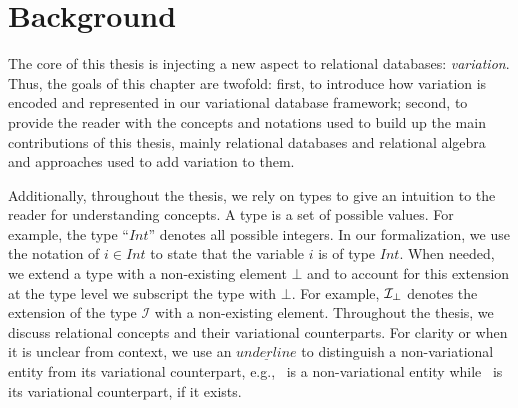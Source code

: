 \chapter{Background}
\label{ch:bg}

The core of this thesis is injecting a new aspect to relational databases: \emph{variation}.
Thus, the goals of this chapter are twofold: 
%
first, to introduce how variation is encoded and represented in our variational database framework;
%
second, to provide the reader with the concepts and notations
used to build up the main contributions of this thesis, mainly relational databases and
relational algebra
%
and approaches used to add variation to them.

%
Additionally, throughout the thesis, we rely on types to give an intuition to the reader for
understanding concepts. A type is a set of possible values. For example, the type ``$\mathit{Int}$''
denotes all possible integers. In our formalization, we use the notation of $i \in \mathit{Int}$ to
state that the variable $i$ is of type $\mathit{Int}$. 
%
%
When needed, we extend a type with a non-existing element $\bot$ and to account for this
extension at the type level we subscript the type with $\bot$. For example, $\maybe {\mathcal{I}}$
denotes the extension of the type $\mathcal{I}$ with a non-existing element.
%
%
Throughout the thesis, we discuss relational concepts and their
variational counterparts. 
For clarity or when it is unclear from context, we use
an $\underline{underline}$ to distinguish a non-variational entity
from its variational counterpart, 
e.g., \pElem\ is a 
non-variational entity while \elem\ is its variational counterpart,
if it exists.


